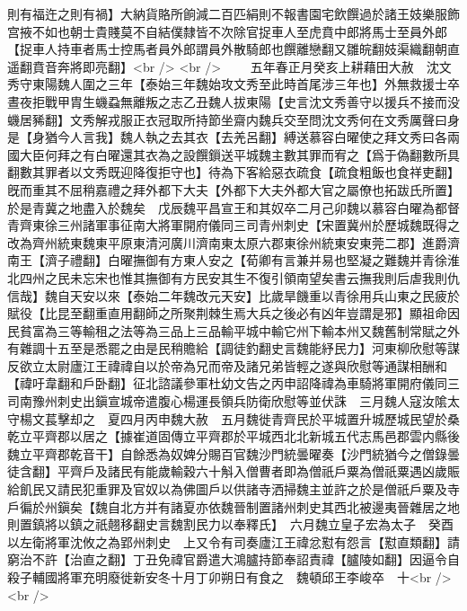 則有福迕之則有禍】大納貨賂所餉減二百匹絹則不報書園宅飲饌過於諸王妓樂服飾宫掖不如也朝士貴賤莫不自結僕隸皆不次除官捉車人至虎賁中郎將馬士至員外郎【捉車人持車者馬士控馬者員外郎謂員外散騎郎也饌離戀翻又雛皖翻妓渠織翻朝直遥翻賁音奔將即亮翻】<br />
<br />
　　五年春正月癸亥上耕藉田大赦　沈文秀守東陽魏人圍之三年【泰始三年魏始攻文秀至此時首尾涉三年也】外無救援士卒晝夜拒戰甲胄生蟣蝨無離叛之志乙丑魏人拔東陽【史言沈文秀善守以援兵不接而没蟣居豨翻】文秀解戎服正衣冠取所持節坐齋内魏兵交至問沈文秀何在文秀厲聲曰身是【身猶今人言我】魏人執之去其衣【去羌呂翻】縛送慕容白曜使之拜文秀曰各兩國大臣何拜之有白曜還其衣為之設饌鎻送平城魏主數其罪而宥之【爲于偽翻數所具翻數其罪者以文秀既迎降復拒守也】待為下客給惡衣疏食【疏食粗飯也食祥吏翻】旣而重其不屈稍嘉禮之拜外都下大夫【外都下大夫外都大官之屬僚也拓跋氏所置】於是青冀之地盡入於魏矣　戊辰魏平昌宣王和其奴卒二月己卯魏以慕容白曜為都督青齊東徐三州諸軍事征南大將軍開府儀同三司青州刺史【宋置冀州於歷城魏既得之改為齊州統東魏東平原東清河廣川濟南東太原六郡東徐州統東安東莞二郡】進爵濟南王【濟子禮翻】白曜撫御有方東人安之【荀卿有言兼并易也堅凝之難魏并青徐淮北四州之民未忘宋也惟其撫御有方民安其生不復引領南望矣書云撫我則后虐我則仇信哉】魏自天安以來【泰始二年魏改元天安】比歲旱饑重以青徐用兵山東之民疲於賦役【比昆至翻重直用翻師之所聚荆棘生焉大兵之後必有凶年豈謂是邪】顯祖命因民貧富為三等輸租之法等為三品上三品輸平城中輸它州下輸本州又魏舊制常賦之外有雜調十五至是悉罷之由是民稍贍給【調徒釣翻史言魏能紓民力】河東柳欣慰等謀反欲立太尉廬江王禕禕自以於帝為兄而帝及諸兄弟皆輕之遂與欣慰等通謀相酬和【禕吁韋翻和戶卧翻】征北諮議參軍杜幼文告之丙申詔降禕為車騎將軍開府儀同三司南豫州刺史出鎭宣城帝遣腹心楊運長領兵防衛欣慰等並伏誅　三月魏人寇汝隂太守楊文萇擊却之　夏四月丙申魏大赦　五月魏徙青齊民於平城置升城歷城民望於桑乾立平齊郡以居之【據崔道固傳立平齊郡於平城西北北新城五代志馬邑郡雲内縣後魏立平齊郡乾音干】自餘悉為奴婢分賜百官魏沙門統曇曜奏【沙門統猶今之僧錄曇徒含翻】平齊戶及諸民有能歲輸穀六十斛入僧曹者即為僧祇戶粟為僧祇粟遇凶歲賑給飢民又請民犯重罪及官奴以為佛圖戶以供諸寺洒掃魏主並許之於是僧祇戶粟及寺戶徧於州鎭矣【魏自北方并有諸夏亦依魏晉制置諸州刺史其西北被邊夷晉雜居之地則置鎮將以鎮之祇翹移翻史言魏割民力以奉釋氏】　六月魏立皇子宏為太子　癸酉以左衛將軍沈攸之為郢州刺史　上又令有司奏廬江王禕忿懟有怨言【懟直類翻】請窮治不許【治直之翻】丁丑免禕官爵遣大鴻臚持節奉詔責禕【臚陵如翻】因逼令自殺子輔國將軍充明廢徙新安冬十月丁卯朔日有食之　魏頓邱王李峻卒　十<br />
<br />
